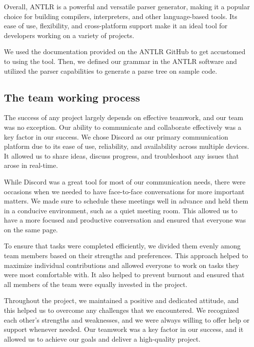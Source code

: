 Overall, ANTLR is a powerful and versatile parser generator, making it a popular choice for building compilers, interpreters, and other language-based tools. Its ease of use, flexibility, and cross-platform support make it an ideal tool for developers working on a variety of projects. 

We used the documentation provided on the ANTLR GitHub to get accustomed to using the tool. Then, we defined our grammar in the ANTLR software and utilized the parser capabilities to generate a parse tree on sample code.

\subsection{The team working process}
The success of any project largely depends on effective teamwork, and our team was no exception. Our ability to communicate and collaborate effectively was a key factor in our success. We chose Discord as our primary communication platform due to its ease of use, reliability, and availability across multiple devices. It allowed us to share ideas, discuss progress, and troubleshoot any issues that arose in real-time.

While Discord was a great tool for most of our communication needs, there were occasions when we needed to have face-to-face conversations for more important matters. We made sure to schedule these meetings well in advance and held them in a conducive environment, such as a quiet meeting room. This allowed us to have a more focused and productive conversation and ensured that everyone was on the same page.

To ensure that tasks were completed efficiently, we divided them evenly among team members based on their strengths and preferences. This approach helped to maximize individual contributions and allowed everyone to work on tasks they were most comfortable with. It also helped to prevent burnout and ensured that all members of the team were equally invested in the project.

Throughout the project, we maintained a positive and dedicated attitude, and this helped us to overcome any challenges that we encountered. We recognized each other's strengths and weaknesses, and we were always willing to offer help or support whenever needed. Our teamwork was a key factor in our success, and it allowed us to achieve our goals and deliver a high-quality project.

